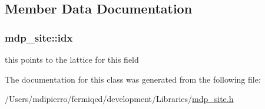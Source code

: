 \subsection{Member Data Documentation}
\hypertarget{classmdp__site_a28354e929a397ee9b0030abe2583b29b}{
\subsubsection[{idx}]{ {\bf mdp\_\-site::idx}}}
\label{classmdp__site_a28354e929a397ee9b0030abe2583b29b}


this points to the lattice for this field 

The documentation for this class was generated from the following file:\begin{DoxyCompactItemize}
\item 
/Users/mdipierro/fermiqcd/development/Libraries/\hyperlink{mdp__site_8h}{mdp\_\-site.h}\end{DoxyCompactItemize}
